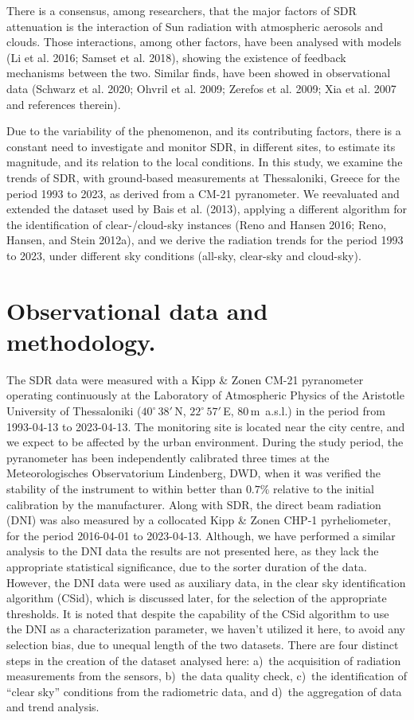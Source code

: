 \documentclass[
]{article}
\begin{document}
There is a consensus, among researchers, that the major factors of SDR attenuation is the interaction of Sun radiation with atmospheric aerosols and clouds.
Those interactions, among other factors, have been analysed with models (Li et al. 2016; Samset et al. 2018), showing the existence of feedback mechanisms between the two.
Similar finds, have been showed in observational data (Schwarz et al. 2020; Ohvril et al. 2009; Zerefos et al. 2009; Xia et al. 2007 and references therein).

Due to the variability of the phenomenon, and its contributing factors, there is a constant need to investigate and monitor SDR, in different sites, to estimate its magnitude, and its relation to the local conditions.
In this study, we examine the trends of SDR, with ground-based measurements at Thessaloniki, Greece for the period 1993 to 2023, as derived from a CM-21 pyranometer.
We reevaluated and extended the dataset used by Bais et al. (2013), applying a different algorithm for the identification of clear-/cloud-sky instances (Reno and Hansen 2016; Reno, Hansen, and Stein 2012a), and we derive the radiation trends for the period 1993 to 2023, under different sky conditions (all-sky, clear-sky and cloud-sky).

\hypertarget{observational-data-and-methodology.}{%
\section{Observational data and methodology.}\label{observational-data-and-methodology.}}

The SDR data were measured with a Kipp \& Zonen CM-21 pyranometer operating continuously at the Laboratory of Atmospheric Physics of the Aristotle University of Thessaloniki
(\(40^\circ\,38'\,\)N, \(22^\circ\,57'\,\)E, \(80\,\)m~a.s.l.)
in the period from
1993-04-13
to
2023-04-13.
The monitoring site is located near the city centre, and we expect to be affected by the urban environment.
During the study period, the pyranometer has been independently calibrated three times at the Meteorologisches Observatorium Lindenberg, DWD, when it was verified the stability of the instrument to within better than \(0.7\%\) relative to the initial calibration by the manufacturer.
Along with SDR, the direct beam radiation (DNI) was also measured by a collocated Kipp \& Zonen CHP-1 pyrheliometer, for the period
2016-04-01
to
2023-04-13.
Although, we have performed a similar analysis to the DNI data the results are not presented here, as they lack the appropriate statistical significance, due to the sorter duration of the data.
However, the DNI data were used as auxiliary data, in the clear sky identification algorithm (CSid), which is discussed later, for the selection of the appropriate thresholds.
It is noted that despite the capability of the CSid algorithm to use the DNI as a characterization parameter, we haven't utilized it here, to avoid any selection bias, due to unequal length of the two datasets.
There are four distinct steps in the creation of the dataset analysed here:
a)~the acquisition of radiation measurements from the sensors,
b)~the data quality check,
c)~the identification of ``clear sky'' conditions from the radiometric data, and
d)~the aggregation of data and trend analysis.
\end{document}
